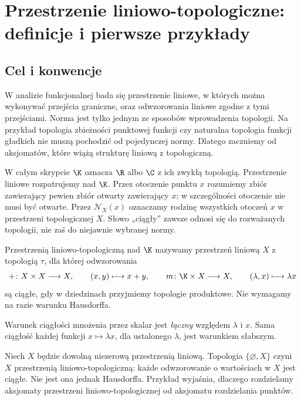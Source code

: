 \section{Przestrzenie liniowo-topologiczne: definicje i pierwsze przykłady}\label{sec:tvs}

\subsection{Cel i konwencje}

W analizie funkcjonalnej bada się przestrzenie liniowe, w których można
wykonywać przejścia graniczne, oraz odwzorowania liniowe zgodne z tymi
przejściami. Norma jest tylko jednym ze sposobów wprowadzenia topologii.
Na przykład topologia zbieżności punktowej funkcji czy naturalna topologia
funkcji gładkich nie muszą pochodzić od pojedynczej normy. Dlatego zaczniemy
od aksjomatów, które wiążą strukturę liniową z topologiczną.

W całym skrypcie $\K$ oznacza $\R$ albo $\C$ z ich zwykłą topologią.
Przestrzenie liniowe rozpatrujemy nad $\K$. Przez otoczenie punktu $x$
rozumiemy zbiór zawierający pewien zbiór otwarty zawierający $x$;
w szczególności otoczenie nie musi być otwarte. Przez $\mathcal N_X(x)$
oznaczamy rodzinę wszystkich otoczeń $x$ w przestrzeni topologicznej $X$.
Słowo „ciągły” zawsze odnosi się do rozważanych topologii, nie zaś
do niejawnie wybranej normy.

\begin{definicja}\label{def:tvs}
Przestrzenią liniowo-topologiczną nad $\K$ nazywamy przestrzeń liniową
$X$ z topologią $\tau$, dla której odwzorowania
\[
 +\colon X\times X\longrightarrow X,\qquad (x,y)\longmapsto x+y,
 \qquad
 m\colon\K\times X\longrightarrow X,\qquad (\lambda,x)\longmapsto\lambda x
\]
są ciągłe, gdy w dziedzinach przyjmiemy topologie produktowe.
Nie wymagamy na razie warunku Hausdorffa.
\end{definicja}

Warunek ciągłości mnożenia przez skalar jest \emph{łączny} względem
$\lambda$ i $x$. Sama ciągłość każdej funkcji $x\mapsto\lambda x$,
dla ustalonego $\lambda$, jest warunkiem słabszym.

\begin{przyklad}
Niech $X$ będzie dowolną niezerową przestrzenią liniową.
Topologia $\{\varnothing,X\}$ czyni $X$ przestrzenią
liniowo-topologiczną: każde odwzorowanie o wartościach w $X$ jest
ciągłe. Nie jest ona jednak Hausdorffa. Przykład wyjaśnia,
dlaczego rozdzielamy aksjomaty przestrzeni liniowo-topologicznej
od aksjomatu rozdzielania punktów.
\end{przyklad}

